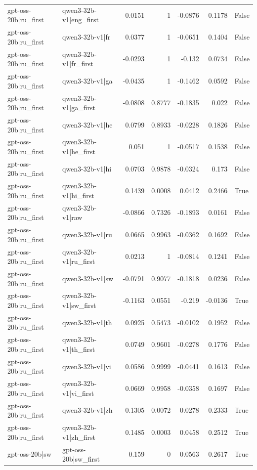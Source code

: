 \begin{table}
\begin{tabular}{l l r r r r l}
gpt-oss-20b|ru_first & qwen3-32b-v1|eng_first & 0.0151 & 1 & -0.0876 & 0.1178 & False \\
gpt-oss-20b|ru_first & qwen3-32b-v1|fr & 0.0377 & 1 & -0.0651 & 0.1404 & False \\
gpt-oss-20b|ru_first & qwen3-32b-v1|fr_first & -0.0293 & 1 & -0.132 & 0.0734 & False \\
gpt-oss-20b|ru_first & qwen3-32b-v1|ga & -0.0435 & 1 & -0.1462 & 0.0592 & False \\
gpt-oss-20b|ru_first & qwen3-32b-v1|ga_first & -0.0808 & 0.8777 & -0.1835 & 0.022 & False \\
gpt-oss-20b|ru_first & qwen3-32b-v1|he & 0.0799 & 0.8933 & -0.0228 & 0.1826 & False \\
gpt-oss-20b|ru_first & qwen3-32b-v1|he_first & 0.051 & 1 & -0.0517 & 0.1538 & False \\
gpt-oss-20b|ru_first & qwen3-32b-v1|hi & 0.0703 & 0.9878 & -0.0324 & 0.173 & False \\
gpt-oss-20b|ru_first & qwen3-32b-v1|hi_first & 0.1439 & 0.0008 & 0.0412 & 0.2466 & True \\
gpt-oss-20b|ru_first & qwen3-32b-v1|raw & -0.0866 & 0.7326 & -0.1893 & 0.0161 & False \\
gpt-oss-20b|ru_first & qwen3-32b-v1|ru & 0.0665 & 0.9963 & -0.0362 & 0.1692 & False \\
gpt-oss-20b|ru_first & qwen3-32b-v1|ru_first & 0.0213 & 1 & -0.0814 & 0.1241 & False \\
gpt-oss-20b|ru_first & qwen3-32b-v1|sw & -0.0791 & 0.9077 & -0.1818 & 0.0236 & False \\
gpt-oss-20b|ru_first & qwen3-32b-v1|sw_first & -0.1163 & 0.0551 & -0.219 & -0.0136 & True \\
gpt-oss-20b|ru_first & qwen3-32b-v1|th & 0.0925 & 0.5473 & -0.0102 & 0.1952 & False \\
gpt-oss-20b|ru_first & qwen3-32b-v1|th_first & 0.0749 & 0.9601 & -0.0278 & 0.1776 & False \\
gpt-oss-20b|ru_first & qwen3-32b-v1|vi & 0.0586 & 0.9999 & -0.0441 & 0.1613 & False \\
gpt-oss-20b|ru_first & qwen3-32b-v1|vi_first & 0.0669 & 0.9958 & -0.0358 & 0.1697 & False \\
gpt-oss-20b|ru_first & qwen3-32b-v1|zh & 0.1305 & 0.0072 & 0.0278 & 0.2333 & True \\
gpt-oss-20b|ru_first & qwen3-32b-v1|zh_first & 0.1485 & 0.0003 & 0.0458 & 0.2512 & True \\
gpt-oss-20b|sw & gpt-oss-20b|sw_first & 0.159 & 0 & 0.0563 & 0.2617 & True \\

\end{tabular}
\end{table}
